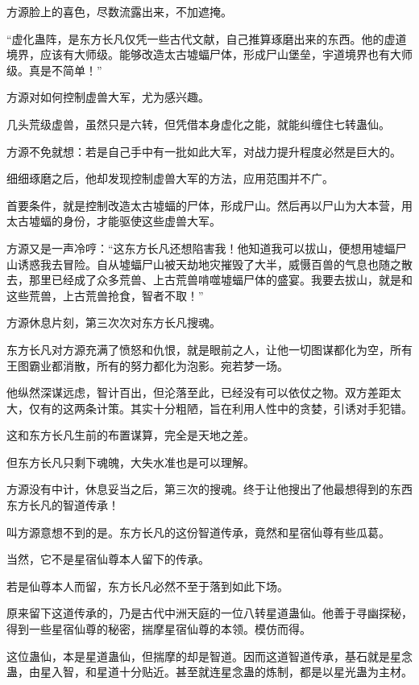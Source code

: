 
\begin{this_body}

方源脸上的喜色，尽数流露出来，不加遮掩。

“虚化蛊阵，是东方长凡仅凭一些古代文献，自己推算琢磨出来的东西。他的虚道境界，应该有大师级。能够改造太古墟蝠尸体，形成尸山堡垒，宇道境界也有大师级。真是不简单！”

方源对如何控制虚兽大军，尤为感兴趣。

几头荒级虚兽，虽然只是六转，但凭借本身虚化之能，就能纠缠住七转蛊仙。

方源不免就想：若是自己手中有一批如此大军，对战力提升程度必然是巨大的。

细细琢磨之后，他却发现控制虚兽大军的方法，应用范围并不广。

首要条件，就是控制改造太古墟蝠的尸体，形成尸山。然后再以尸山为大本营，用太古墟蝠的身份，才能驱使这些虚兽大军。

方源又是一声冷哼：“这东方长凡还想陷害我！他知道我可以拔山，便想用墟蝠尸山诱惑我去冒险。自从墟蝠尸山被天劫地灾摧毁了大半，威慑百兽的气息也随之散去，那里已经成了众多荒兽、上古荒兽啃噬墟蝠尸体的盛宴。我要去拔山，就是和这些荒兽，上古荒兽抢食，智者不取！”

方源休息片刻，第三次次对东方长凡搜魂。

东方长凡对方源充满了愤怒和仇恨，就是眼前之人，让他一切图谋都化为空，所有王图霸业都消散，所有的努力都化为泡影。宛若梦一场。

他纵然深谋远虑，智计百出，但沦落至此，已经没有可以依仗之物。双方差距太大，仅有的这两条计策。其实十分粗陋，旨在利用人性中的贪婪，引诱对手犯错。

这和东方长凡生前的布置谋算，完全是天地之差。

但东方长凡只剩下魂魄，大失水准也是可以理解。

方源没有中计，休息妥当之后，第三次的搜魂。终于让他搜出了他最想得到的东西东方长凡的智道传承！

叫方源意想不到的是。东方长凡的这份智道传承，竟然和星宿仙尊有些瓜葛。

当然，它不是星宿仙尊本人留下的传承。

若是仙尊本人而留，东方长凡必然不至于落到如此下场。

原来留下这道传承的，乃是古代中洲天庭的一位八转星道蛊仙。他善于寻幽探秘，得到一些星宿仙尊的秘密，揣摩星宿仙尊的本领。模仿而得。

这位蛊仙，本是星道蛊仙，但揣摩的却是智道。因而这道智道传承，基石就是星念蛊，由星入智，和星道十分贴近。甚至就连星念蛊的炼制，都是以星光蛊为主材。


\end{this_body}

